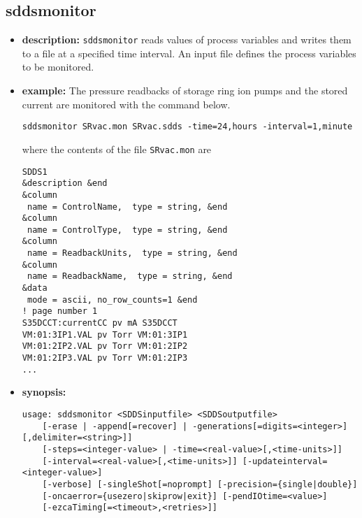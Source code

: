 %
%
\begin{latexonly}
\newpage
\end{latexonly}

%
%
\subsection{sddsmonitor}
\label{sddsmonitor}

\begin{itemize}
\item {\bf description:}
%
%
\verb+sddsmonitor+ reads values of process variables and writes them to a file at a specified time interval.
An input file defines the process variables to be monitored.
\item {\bf example:} 
%
% 
%
The pressure readbacks of storage ring ion pumps and the stored current are monitored
with the command below.
\begin{verbatim}
sddsmonitor SRvac.mon SRvac.sdds -time=24,hours -interval=1,minute
\end{verbatim}
where the contents of the file \verb+SRvac.mon+ are
\begin{verbatim}
SDDS1
&description &end
&column
 name = ControlName,  type = string, &end
&column
 name = ControlType,  type = string, &end
&column
 name = ReadbackUnits,  type = string, &end
&column
 name = ReadbackName,  type = string, &end
&data
 mode = ascii, no_row_counts=1 &end
! page number 1
S35DCCT:currentCC pv mA S35DCCT
VM:01:3IP1.VAL pv Torr VM:01:3IP1
VM:01:2IP2.VAL pv Torr VM:01:2IP2 
VM:01:2IP3.VAL pv Torr VM:01:2IP3 
...
\end{verbatim}
\item {\bf synopsis:} 
%
%
\begin{verbatim}
usage: sddsmonitor <SDDSinputfile> <SDDSoutputfile>
    [-erase | -append[=recover] | -generations[=digits=<integer>][,delimiter=<string>]]
    [-steps=<integer-value> | -time=<real-value>[,<time-units>]] 
    [-interval=<real-value>[,<time-units>]] [-updateinterval=<integer-value>]
    [-verbose] [-singleShot[=noprompt] [-precision={single|double}]
    [-oncaerror={usezero|skiprow|exit}] [-pendIOtime=<value>] 
    [-ezcaTiming[=<timeout>,<retries>]]

\end{verbatim}
\end{itemize}
